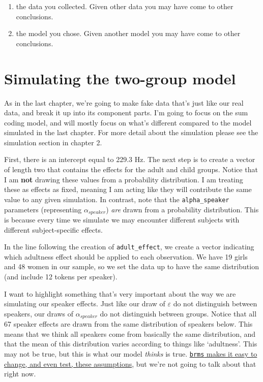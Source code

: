 \documentclass[
]{book}
\begin{document}
\begin{enumerate}
\def\labelenumi{\arabic{enumi})}
\item
  the data you collected. Given other data you may have come to other conclusions.
\item
  the model you chose. Given another model you may have come to other conclusions.
\end{enumerate}

\hypertarget{simulating-the-two-group-model}{%
\section{Simulating the two-group model}\label{simulating-the-two-group-model}}

As in the last chapter, we're going to make fake data that's just like our real data, and break it up into its component parts. I'm going to focus on the sum coding model, and will mostly focus on what's different compared to the model simulated in the last chapter. For more detail about the simulation please see the simulation section in chapter 2.

First, there is an intercept equal to 229.3 Hz. The next step is to create a vector of length two that contains the effects for the adult and child groups. Notice that I am \textbf{not} drawing these values from a probability distribution. I am treating these as effects as fixed, meaning I am acting like they will contribute the same value to any given simulation. In contrast, note that the \texttt{alpha\_speaker} parameters (representing \(\alpha_{speaker}\)) \emph{are} drawn from a probability distribution. This is because every time we simulate we may encounter different subjects with different subject-specific effects.

In the line following the creation of \texttt{adult\_effect}, we create a vector indicating which adultness effect should be applied to each observation. We have 19 girls and 48 women in our sample, so we set the data up to have the same distribution (and include 12 tokens per speaker).

I want to highlight something that's very important about the way we are simulating our speaker effects. Just like our draw of \(\varepsilon\) do not distinguish between speakers, our draws of \(\alpha_{speaker}\) do not distinguish between groups. Notice that all 67 speaker effects are drawn from the same distribution of speakers below. This means that we think all speakers come from basically the same distribution, and that the mean of this distribution varies according to things like `adultness'. This may not be true, but this is what our model \emph{thinks} is true. \href{https://github.com/paul-buerkner/brms/issues/365}{\texttt{brms} makes it easy to change, and even test, these assumptions}, but we're not going to talk about that right now.
\end{document}
